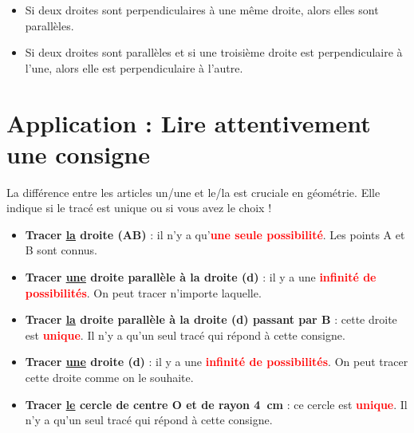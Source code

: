 \begin{proprietebox}
\begin{itemize}[label = \textbullet]
    \item Si deux droites sont perpendiculaires à une même droite, alors elles sont parallèles.
    \item Si deux droites sont parallèles et si une troisième droite est perpendiculaire à l'une, alors elle est perpendiculaire à l'autre.
\end{itemize}

\vspace{0.3cm}
\begin{center}
\end{center}
\end{proprietebox}

\clearpage
\section{Application : Lire attentivement une consigne}

\noindent
La différence entre les articles \og un/une \fg{} et \og le/la \fg{} est cruciale en géométrie. 
Elle indique si le tracé est unique ou si vous avez le choix !

\vspace{0.5cm} %

\begin{itemize}
	\item \textbf{Tracer \underline{la} droite (AB)} : il n'y a qu'\textbf{\textcolor{red}{une seule possibilité}}. Les points A et B sont connus.
	\item \textbf{Tracer \underline{une} droite parallèle à la droite (d)} : il y a une \textbf{\textcolor{red}{infinité de possibilités}}. On peut tracer n'importe laquelle.
	\item \textbf{Tracer \underline{la} droite parallèle à la droite (d) passant par B} : cette droite est \textbf{\textcolor{red}{unique}}. Il n'y a qu'un seul tracé qui répond à cette consigne.
	\item \textbf{Tracer \underline{une} droite (d)} : il y a une \textbf{\textcolor{red}{infinité de possibilités}}. On peut tracer cette droite comme on le souhaite.
	\item \textbf{Tracer \underline{le} cercle de centre O et de rayon 4~cm} : ce cercle est \textbf{\textcolor{red}{unique}}. Il n'y a qu'un seul tracé qui répond à cette consigne.
\end{itemize}

